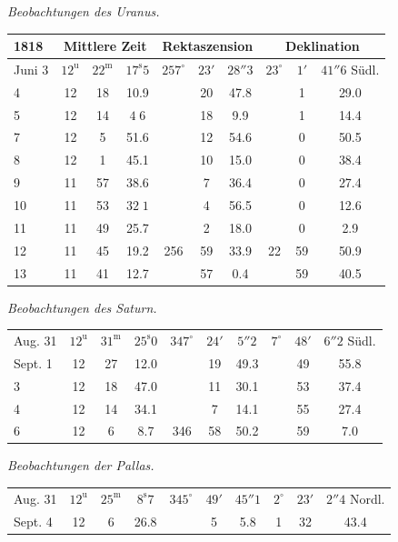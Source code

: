 \begin{center}
\emph{Beobachtungen des Uranus.}

\setlength{\tabcolsep}{2.2pt}\begin{tabular}{l|ccc|ccc|ccc}
\hline
1818 & \multicolumn{3}{c|}{Mittlere Zeit} & \multicolumn{3}{c|}{Rektaszension} & \multicolumn{3}{c}{Deklination} \\
\hline
Juni 3 & $12^{\mathrm u}$ & $22^{\mathrm m}$ & $17^{\mathrm s}5$ & $257^\circ$ & $23'$ & $28''3$ & $23^\circ$ & $1'$ & $41''6$ Südl. \\ 
4 & 12 & 18 & 10.9 & & 20 & 47.8 & & 1 & 29.0 \\
5 & 12 & 14 & $4\;6$ & & 18 & 9.9 & & 1 & 14.4 \\
7 & 12 & 5 & 51.6 & & 12 & 54.6 & & 0 & 50.5 \\ 
8 & 12 & 1 & 45.1 & & 10 & 15.0 & & 0 & 38.4 \\
9 & 11 & 57 & 38.6 & & 7 & 36.4 & & 0 & 27.4 \\
10 & 11 & 53 & $32\;1$ & & 4 & 56.5 & & 0 & 12.6 \\
11 & 11 & 49 & 25.7 & & 2 & 18.0 & & 0 & 2.9 \\
12 & 11 & 45 & 19.2 & 256 & 59 & 33.9 & 22 & 59 & 50.9 \\
13 & 11 & 41 & 12.7 & & 57 & 0.4 & & 59 & 40.5 \\
\hline
\end{tabular}
\end{center}

\begin{center}
\emph{Beobachtungen des Saturn.}

\setlength{\tabcolsep}{2.2pt}\begin{tabular}{l|ccc|ccc|ccc}
\hline
Aug. 31 & $12^{\mathrm u}$ & $31^{\mathrm m}$ & $25^{\mathrm s}0$ & $347^\circ$ & $24'$ & $5''2$ & $7^\circ$ & $48'$ & $6''2$ Südl. \\
Sept. 1 & 12 & 27 & 12.0 & & 19 & 49.3 & & 49 & 55.8 \\
3 & 12 & 18 & 47.0 & & 11 & 30.1 & & 53 & 37.4 \\
4 & 12 & 14 & 34.1 & & 7 & 14.1 & & 55 & 27.4 \\
6 & 12 & 6 & 8.7 & 346 & 58 & 50.2 & & 59 & 7.0 \\
\hline
\end{tabular}
\end{center}

\begin{center}
\emph{Beobachtungen der Pallas.}

\setlength{\tabcolsep}{2.2pt}\begin{tabular}{l|ccc|ccc|ccc}
\hline
Aug. 31 & $12^{\mathrm u}$ & $25^{\mathrm m}$ & $8^{\mathrm s}7$ & $345^\circ$ & $49'$ & $45''1$ & $2^\circ$ & $23'$ & $2''4$ Nordl. \\
Sept. 4 & 12 & 6 & 26.8 & & 5 & 5.8 & 1 & 32 & 43.4 \\
\hline
\end{tabular}
\end{center}

